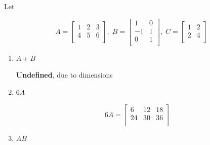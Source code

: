 \documentclass[../../Main.tex]{subfiles}
\begin{document}
\begin{example}
    Let

    \[
    A =
    \begin{bmatrix}
        1 & 2 & 3 \\
        4 & 5 & 6 \\
    \end{bmatrix}
    , \;
    B =
    \begin{bmatrix}
    1 & 0 \\
    -1 & 1 \\
    0 & 1 \\
    \end{bmatrix}
    , \;
    C =
    \begin{bmatrix}
    1 & 2 \\
    2 & 4 \\
    \end{bmatrix}
    \]

    \begin{enumerate}
        \item
        {
            $A + B$

            \begin{solution}
                \textbf{Undefined}, due to dimensions
            \end{solution}
        }

        \item 
        {
            $6A$

            \begin{solution}
                \[
                    6A =
                    \begin{bmatrix}
                        6 & 12 & 18 \\
                        24 & 30 & 36 \\
                    \end{bmatrix}
                \]
            \end{solution}
        }

        \item
        {
            $AB$

}
\end{enumerate}
\end{example}
\end{document}
